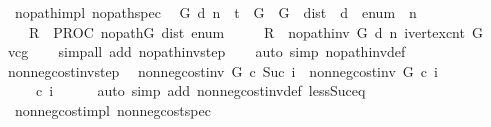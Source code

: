 \begin{isabellebody}
\ {\isacharparenleft}\ no{\isacharunderscore}path{\isacharunderscore}impl{\isacharparenright}\ no{\isacharunderscore}path{\isacharunderscore}spec{\isacharcolon}\isanewline
\ \ {\isachardoublequoteopen}{\isasymforall}G\ d\ n{\isachardot}\ {\isasymGamma}\ {\isasymturnstile}\isactrlsub t\ {\isasymlbrace}\ {\isasymacute}G\ {\isacharequal}\ G\ {\isasymand}\ {\isasymacute}dist\ {\isacharequal}\ d\ {\isasymand}\ {\isasymacute}enum\ {\isacharequal}\ n{\isasymrbrace}\isanewline
\ \ \ \ {\isasymacute}R\ {\isacharcolon}{\isacharequal}{\isacharequal}\ PROC\ no{\isacharunderscore}path{\isacharparenleft}{\isasymacute}G{\isacharcomma}\ {\isasymacute}dist{\isacharcomma}\ {\isasymacute}enum{\isacharparenright}\isanewline
\ \ \ \ {\isasymlbrace}\ {\isasymacute}R\ {\isacharequal}\ no{\isacharunderscore}path{\isacharunderscore}inv\ G\ d\ n\ {\isacharparenleft}ivertex{\isacharunderscore}cnt\ G{\isacharparenright}{\isasymrbrace}{\isachardoublequoteclose}\isanewline
%
\isadelimproof
\ \ %
\endisadelimproof
%
\isatagproof
{}\isamarkupfalse%
\ vcg\isanewline
\ \ \isamarkupfalse%
\ {\isacharparenleft}simp{\isacharunderscore}all\ add{\isacharcolon}\ no{\isacharunderscore}path{\isacharunderscore}inv{\isacharunderscore}step{\isacharparenright}\isanewline
\ \ \isamarkupfalse%
\ {\isacharparenleft}auto\ simp{\isacharcolon}\ no{\isacharunderscore}path{\isacharunderscore}inv{\isacharunderscore}def{\isacharparenright}\isanewline
{}\isamarkupfalse%
%
\endisatagproof
{\isafoldproof}%
%
\isadelimproof
\isanewline
%
\endisadelimproof
\isanewline
{}\isamarkupfalse%
\ non{\isacharunderscore}neg{\isacharunderscore}cost{\isacharunderscore}inv{\isacharunderscore}step{\isacharcolon}\isanewline
\ \ {\isachardoublequoteopen}non{\isacharunderscore}neg{\isacharunderscore}cost{\isacharunderscore}inv\ G\ c\ {\isacharparenleft}Suc\ i{\isacharparenright}\ {\isasymlongleftrightarrow}\ non{\isacharunderscore}neg{\isacharunderscore}cost{\isacharunderscore}inv\ G\ c\ i\isanewline
\ \ \ \ {\isasymand}\ c\ i\ {\isasymge}\ {}{\isachardoublequoteclose}\isanewline
%
\isadelimproof
\ \ %
\endisadelimproof
%
\isatagproof
{}\isamarkupfalse%
\ {\isacharparenleft}auto\ simp\ add{\isacharcolon}\ non{\isacharunderscore}neg{\isacharunderscore}cost{\isacharunderscore}inv{\isacharunderscore}def\ less{\isacharunderscore}Suc{\isacharunderscore}eq{\isacharparenright}%
\endisatagproof
{\isafoldproof}%
%
\isadelimproof
\isanewline
%
\endisadelimproof
\isanewline
{}\isamarkupfalse%
\ {\isacharparenleft}\ non{\isacharunderscore}neg{\isacharunderscore}cost{\isacharunderscore}impl{\isacharparenright}\ non{\isacharunderscore}neg{\isacharunderscore}cost{\isacharunderscore}spec{\isacharcolon}\isanewline

\end{isabellebody}
